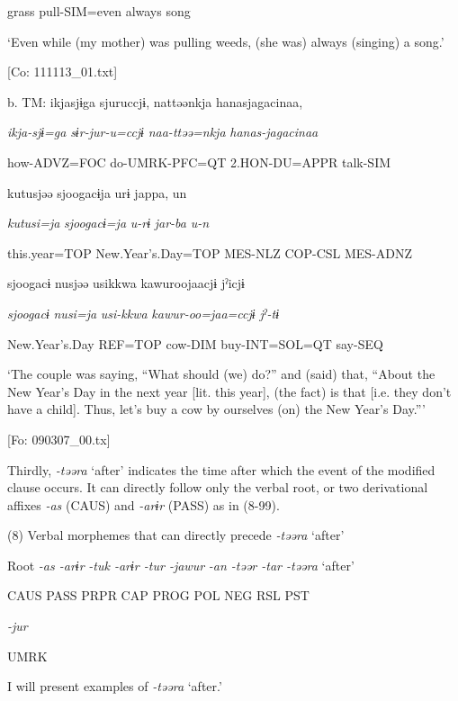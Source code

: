       grass  pull-SIM=even  always  song

      ‘Even while (my mother) was pulling weeds, (she was) always (singing) a song.’

      [Co: 111113\_01.txt]

  b.  TM:  ikjasjɨga  sjuruccjɨ,  nattəənkja  hanasjagacinaa,

      \textit{ikja-sjɨ=ga}  \textit{sɨr-jur-u=ccjɨ}  \textit{naa-ttəə=nkja}  \textit{hanas-jagacinaa}

      how-ADVZ=FOC  do-UMRK-PFC=QT  2.HON-DU=APPR  talk-SIM

      kutusjəə  sjoogacɨja  urɨ  jappa,  un

      \textit{kutusi=ja}  \textit{sjoogacɨ=ja}  \textit{u-rɨ}  \textit{jar-ba}  \textit{u-n}

      this.year=TOP  New.Year’s.Day=TOP  MES-NLZ  COP-CSL  MES-ADNZ

      sjoogacɨ  nusjəə  usikkwa  kawuroojaacjɨ  jˀicjɨ

      \textit{sjoogacɨ}  \textit{nusi=ja}  \textit{usi-kkwa}  \textit{kawur-oo=jaa=ccjɨ}  \textit{jˀ-tɨ}

      New.Year’s.Day  REF=TOP  cow-DIM  buy-INT=SOL=QT  say-SEQ

      ‘The couple was saying, “What should (we) do?” and (said) that, “About the New Year’s Day in the next year [lit. this year], (the fact) is that [i.e. they don’t have a child]. Thus, let’s buy a cow by ourselves (on) the New Year’s Day.”’

      [Fo: 090307\_00.tx]

  Thirdly, \textit{{}-təəra} ‘after’ indicates the time after which the event of the modified clause occurs. It can directly follow only the verbal root, or two derivational affixes \textit{{}-as} (CAUS) and \textit{{}-arɨr} (PASS) as in (8-99).

(8)  Verbal morphemes that can directly precede \textit{{}-təəra} ‘after’

  Root  \textit{{}-as  {}-arɨr} %
\textit{{}-tuk  {}-arɨr  {}-tur  {}-jawur} %
\textit{{}-an  {}-təər  {}-tar  {}-təəra} ‘after’

    CAUS  PASS  PRPR  CAP  PROG  POL  NEG  RSL  PST  

          \textit{{}-jur} 

          UMRK    

I will present examples of \textit{{}-təəra} ‘after.’

